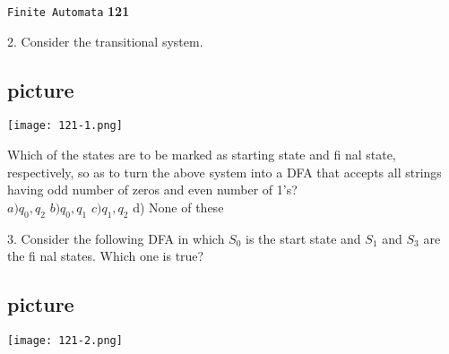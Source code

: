\documentclass{article}
\begin{document}
\begin{flushright}
 \texttt{Finite Automata} \hspace*{1cm} \textbf{121}
\end{flushright}

\vspace*{0.5cm}

\vspace*{3mm}
\hspace{-0.5cm}
2. Consider the transitional system.\\
\vspace*{3mm}

\begin{center}
\section{picture}
\texttt{[image: 121-1.png]}
\end{center}

Which of the states are to be marked as starting state and fi nal state, respectively, so as to turn the
above system into a DFA that accepts all strings having odd number of zeros and even number of 1’s?\\

\vspace*{0.2cm}
$a) q _{0}, q _{2}$   \hspace*{0.5cm}  $b) q _{0}, q _{1}$   \hspace*{0.5cm}  $c) q _{1}, q _{2}$  \hspace*{0.5cm}   d) None of these\\

\vspace*{0.3cm}



\vspace*{3mm}
\hspace{-0.5cm}
3. Consider the following DFA in which $S_0$ is the start state and $S_1$ and $S_3$ are the fi nal states. Which
one is true?\\
\vspace*{3mm}

\begin{center}
\section{picture}
\texttt{[image: 121-2.png]}
\end{center}

\vspace*{3mm}
\hspace{0.5cm}
\end{document}
